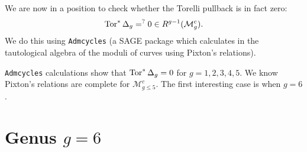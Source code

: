 \documentclass[reqno]{amsart} 
\begin{document}
We are now in a position to check whether the Torelli pullback is in fact zero:
\begin{equation*}
  \operatorname{Tor}^\ast \Delta_g =^? 0 \in R^{g - 1}(\mathcal{M}_g^{c}).
\end{equation*}
We do this using \verb|Admcycles| (a SAGE package which calculates in the tautological algebra of the moduli of curves using Pixton's relations).

\verb|Admcycles| calculations show that $\operatorname{Tor}^\ast \Delta_g = 0$ for $g = 1,2,3,4,5$.  We know Pixton's relations are complete for $\mathcal{M}_{g \leq 5}^{c}$.  The first interesting case is when $g = 6$.

\section{Genus $g = 6$}
\end{document}
